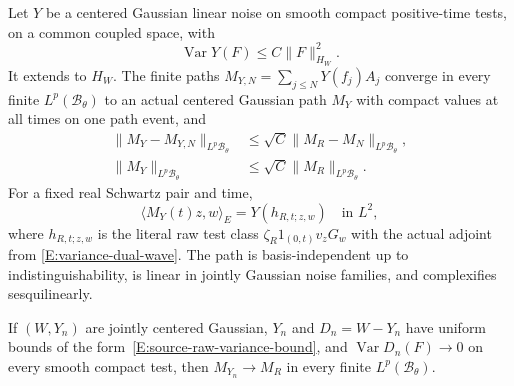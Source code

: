 \begin{proposition}
  \label{P:source-gaussian-transfer}
  Let $Y$ be a centered Gaussian linear noise on smooth compact positive-time
  tests, on a common coupled space, with
  \begin{equation}\label{E:source-raw-variance-bound}
    \operatorname{Var}Y(F)\le C\|F\|_{H_W}^2.
  \end{equation}
  It extends to $H_W$. The finite paths
  $M_{Y,N}=\sum_{j\le N}Y(f_j)A_j$ converge in every finite
  $L^p(\mathscr B_\theta)$ to an actual centered Gaussian path $M_Y$ with
  compact values at all times on one path event, and
  \begin{align}
    \|M_Y-M_{Y,N}\|_{L^p\mathscr B_\theta}
    &\le\sqrt C\|M_R-M_N\|_{L^p\mathscr B_\theta},\label{E:source-transfer-tail}\\
    \|M_Y\|_{L^p\mathscr B_\theta}
    &\le\sqrt C\|M_R\|_{L^p\mathscr B_\theta}.\label{E:source-transfer-norm}
  \end{align}
  For a fixed real Schwartz pair and time,
  \begin{equation}\label{E:source-transferred-row}
    \langle M_Y(t)z,w\rangle_E=Y(h_{R,t;z,w})\quad\text{in }L^2,
  \end{equation}
  where $h_{R,t;z,w}$ is the literal raw test class
  $\zeta_R1_{(0,t)}v_zG_w$ with the actual adjoint from
  \eqref{E:variance-dual-wave}. The path is basis-independent up to
  indistinguishability, is linear in jointly Gaussian noise families, and
  complexifies sesquilinearly.

  If $(W,Y_n)$ are jointly centered Gaussian, $Y_n$ and $D_n=W-Y_n$
  have uniform bounds of the form~\eqref{E:source-raw-variance-bound},
  and $\operatorname{Var}D_n(F)\to0$ on every smooth compact test,
  then $M_{Y_n}\to M_R$ in every finite $L^p(\mathscr B_\theta)$.
\end{proposition}


